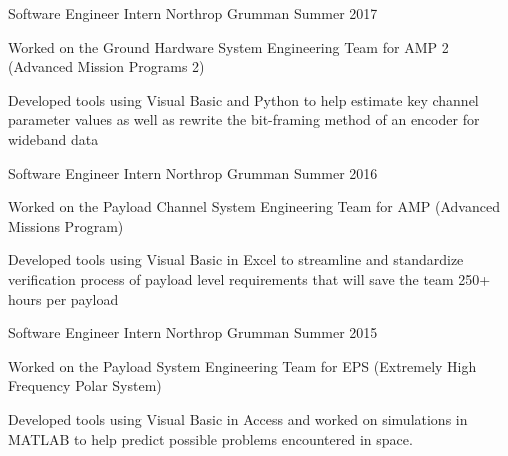 \vspace{-4mm}
\vspace{-3mm}



\begin{cventries}
  \cventry
    {Software Engineer Intern} %
    {Northrop Grumman} %
    {Summer 2017} %
    {} %
    {
      \begin{cvitems} %
        \item {Worked on the Ground Hardware System Engineering Team for AMP 2 (Advanced Mission Programs 2)}
        \item {Developed tools using Visual Basic and Python to help estimate key channel parameter values as well as rewrite the bit-framing method of an encoder for wideband data}
      \end{cvitems}
    }


  \cventry
    {Software Engineer Intern} %
    {Northrop Grumman} %
    {Summer 2016} %
    {} %
    {
      \begin{cvitems} %
        \item {Worked on the Payload Channel System Engineering Team for AMP (Advanced Missions Program)}
        \item {Developed tools using Visual Basic in Excel to streamline and standardize verification process of payload level requirements that will save the team 250+ hours per payload}
      \end{cvitems}
    }

  \cventry
    {Software Engineer Intern} %
    {Northrop Grumman} %
    {Summer 2015} %
    {} %
    {
      \begin{cvitems} %
        \item {Worked on the Payload System Engineering Team for EPS (Extremely High Frequency Polar System)}
        \item {Developed tools using Visual Basic in Access and worked on simulations in MATLAB to help predict possible problems encountered in space.}
      \end{cvitems}
    }


\end{cventries}
